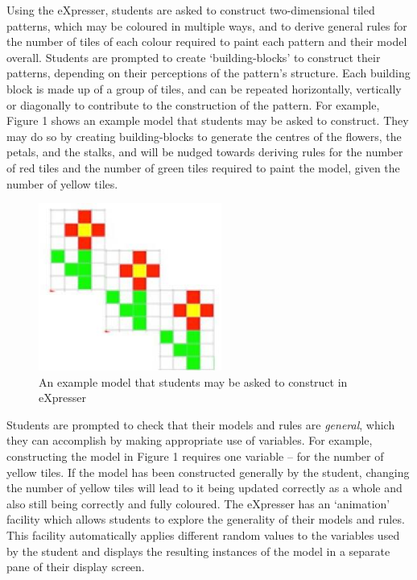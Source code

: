 Using the eXpresser, students are asked to construct
two-dimensional tiled patterns, which may be coloured in multiple ways, 
and to derive general rules for the number of tiles of each
colour required to paint each pattern and their model
overall. Students are prompted to create `building-blocks' to
construct their patterns, depending on their perceptions of the
pattern’s structure. Each building block is made up of a group of
tiles, and can be repeated horizontally, vertically or diagonally to
contribute to the construction of the pattern. For example, Figure 1
shows an example model that students may be asked to construct. They
may do so by creating building-blocks to
generate the centres of the flowers, the petals, and the stalks, and
will be nudged
towards deriving rules for the number of red tiles and the number of
green tiles required to paint the model, given the number of yellow
tiles.

\begin{figure}[htbp]
  \centering
  \includegraphics[width=6cm]{gfx/example.eps}
  \caption{An example model that students may be asked to construct in
    eXpresser} 
  \label{fig:example}
\end{figure}


Students are prompted to check that their models and rules are {\em
  general}, which they can accomplish by making appropriate use of
variables. For example, constructing the model in Figure 1 requires
one variable – for the number of yellow tiles. If the model has been
constructed generally by the student, changing the number of yellow
tiles will lead to it being updated correctly as a whole and also
still being correctly and fully coloured. The eXpresser has an
`animation' facility which allows students to explore the generality
of their models and rules. This facility automatically applies
different random values to the variables used by the student and
displays the resulting instances of the model in a separate pane of
their display screen.  

